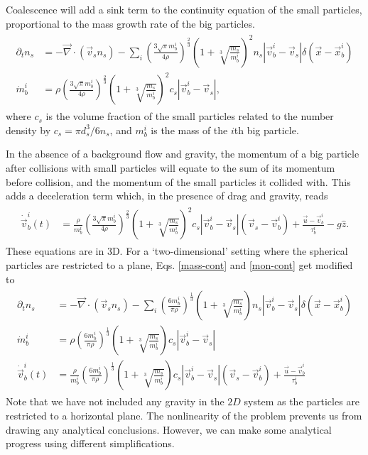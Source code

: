 \documentclass[../Rajarshi-thesis-draft.tex]{subfiles}
\begin{document}
Coalescence will add a sink term to the continuity equation of the small particles, proportional to the mass growth rate of the big particles. 
\begin{align}
\label{mass-cont}
\begin{split}
    \partial_t n_s &= - \vec{\nabla} \cdot (\vec{v}_s n_s) - \sum\limits_{i}^{}\left(\frac{3\sqrt{\pi}m_b^i}{4\rho}\right)^{\frac23}\left( 1 +  \sqrt[3]{\frac{m_s}{m_b^i}} \right)^2 n_s |\vec{v}_b^i - \vec{v}_s| \delta(\vec{x} - \vec{x}_b^i) \\
    \dot{m}_b^i &= \rho \left(\frac{3\sqrt{\pi}m_b^i}{4\rho}\right)^{\frac23}\left( 1 + \sqrt[3]{\frac{m_s}{m_b^i}}\right)^2 c_s |\vec{v}_b^i - \vec{v}_s| ,
\end{split}
\end{align}
where $c_s$ is the volume fraction of the small particles related to the number density by $c_s = \pi d_s^3/6 n_s$, and $m_b^i$ is the mass of the $i$th big particle.

In the absence of a background flow and gravity, the momentum of a big particle after collisions with small particles will equate to the sum of its momentum before collision, and the momentum of the small particles it collided with. This adds a deceleration term which, in the presence of drag and gravity, reads
\begin{align}
\label{mon-cont}
\begin{split}
    \dot{\vec{v}}_b^i(t) &= \frac{\rho}{m_b^i} \left(\frac{3\sqrt{\pi}m_b^i}{4\rho}\right)^{\frac23}\left( 1 + \sqrt[3]{\frac{m_s}{m_b^i}} \right)^2 c_s|\vec{v}_b^i - \vec{v}_s|\left( \vec{v}_s - \vec{v}_b^i \right) + \frac{\vec{u}- \vec{v}_b^i}{\tau_b^i} - g \hat{z}.
\end{split}
\end{align}
These equations are in $3$D. For a `two-dimensional' setting where the spherical particles are restricted to a plane, Eqs. \eqref{mass-cont} and \eqref{mon-cont} get modified to 
\begin{align}
\label{2D-lck}
\begin{split}
    \partial_t n_s &= - \vec{\nabla} \cdot (\vec{v}_s n_s) - \sum\limits_{i}^{}\left(\frac{6m_b^i}{\pi\rho}\right)^{\frac13}\left( 1 +  \sqrt[3]{\frac{m_s}{m_b^i}} \right) n_s |\vec{v}_b^i - \vec{v}_s| \delta(\vec{x} - \vec{x}_b^i) \\
    \dot{m}_b^i &= \rho \left(\frac{6m_b^i}{\pi\rho}\right)^{\frac13}\left( 1 +  \sqrt[3]{\frac{m_s}{m_b^i}} \right) c_s |\vec{v}_b^i - \vec{v}_s| \\
    \dot{\vec{v}}_b^i(t) &= \frac{\rho}{m_b^i} \left(\frac{6m_b^i}{\pi\rho}\right)^{\frac13}\left( 1 +  \sqrt[3]{\frac{m_s}{m_b^i}} \right)c_s|\vec{v}_b^i - \vec{v}_s|\left( \vec{v}_s - \vec{v}_b^i \right) + \frac{\vec{u}- \vec{v}_b^i}{\tau_b^i} 
\end{split}
\end{align}
Note that we have not included any gravity in the $2D$ system as the particles are restricted to a horizontal plane. The nonlinearity of the problem prevents us from drawing any analytical conclusions. However, we can make some analytical progress using different simplifications. 
\end{document}
